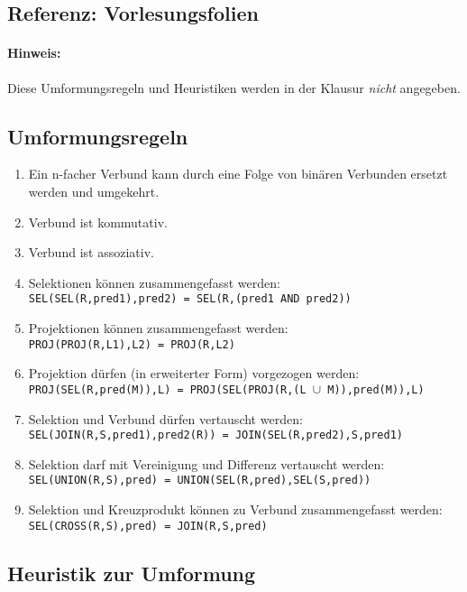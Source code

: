 \begin{note}

\section*{Referenz: Vorlesungsfolien}

\paragraph{Hinweis:} Diese Umformungsregeln und Heuristiken werden in der Klausur \emph{nicht} angegeben.

\subsection*{Umformungsregeln}

\begin{enumerate}
	\item Ein n-facher Verbund kann durch eine Folge von binären Verbunden ersetzt werden und umgekehrt.
	\item Verbund ist kommutativ.
	\item Verbund ist assoziativ.
	\item Selektionen können zusammengefasst werden: \\
	\texttt{SEL(SEL(R,pred1),pred2) = SEL(R,(pred1 AND pred2))}
	\item Projektionen können zusammengefasst werden: \\
	\texttt{PROJ(PROJ(R,L1),L2) = PROJ(R,L2)}
	\item Projektion dürfen (in erweiterter Form) vorgezogen werden: \\
	\texttt{PROJ(SEL(R,pred(M)),L) = PROJ(SEL(PROJ(R,(L $\cup$ M)),pred(M)),L)}
	\item Selektion und Verbund dürfen vertauscht werden: \\
	\texttt{SEL(JOIN(R,S,pred1),pred2(R)) = JOIN(SEL(R,pred2),S,pred1)}
	\item Selektion darf mit Vereinigung und Differenz vertauscht werden: \\
	\texttt{SEL(UNION(R,S),pred) = UNION(SEL(R,pred),SEL(S,pred))}
	\item Selektion und Kreuzprodukt können zu Verbund zusammengefasst werden: \\
	\texttt{SEL(CROSS(R,S),pred) = JOIN(R,S,pred)}
\end{enumerate}


\subsection*{Heuristik zur Umformung}


\end{note}
